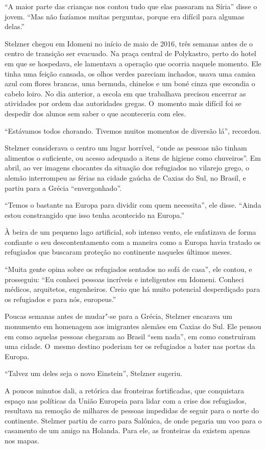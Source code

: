 ``A maior parte das crianças nos contou tudo que elas passaram na
Síria'' disse o jovem. ``Mas não fazíamos muitas perguntas, porque era
difícil para algumas delas.''

Stelzner chegou em Idomeni no início de maio de 2016, três semanas antes
de o centro de transição ser evacuado. Na praça central de Polykastro,
perto do hotel em que se hospedava, ele lamentava a operação que ocorria
naquele momento. Ele tinha uma feição cansada, os olhos verdes pareciam
inchados, usava uma camisa azul com flores brancas, uma bermuda, chinelos
e um boné cinza que escondia o cabelo loiro. No dia anterior, a escola em
que trabalhava precisou encerrar as atividades por ordem das autoridades
gregas. O~momento mais difícil foi se despedir dos alunos sem saber o
que aconteceria com eles.

``Estávamos todos chorando. Tivemos muitos momentos de
diversão lá'', recordou.

Stelzner considerava o centro um lugar horrível, ``onde as pessoas não
tinham alimentos o suficiente, ou acesso adequado a itens de higiene
como chuveiros''. Em abril, ao ver imagens chocantes da situação dos
refugiados no vilarejo grego, o alemão interrompeu as férias na cidade
gaúcha de Caxias do Sul, no Brasil, e partiu para a Grécia
``envergonhado''.

``Temos o bastante na Europa para dividir com quem necessita'', ele disse.
``Ainda estou constrangido que isso tenha acontecido na Europa.''

À beira de um pequeno lago artificial, sob intenso vento, ele enfatizava
de forma confiante o seu descontentamento com a maneira como a Europa
havia tratado os refugiados que buscaram proteção no continente naqueles
últimos meses.

``Muita gente opina sobre os refugiados sentados no sofá de casa'',
ele contou, e prosseguiu: ``Eu conheci pessoas incríveis e inteligentes em Idomeni.
Conheci médicos, arquitetos, engenheiros. Creio que há muito potencial
desperdiçado para os refugiados e para nós, europeus.''

Poucas semanas antes de mudar"-se para a Grécia, Stelzner encarava um
monumento em homenagem aos imigrantes alemães em Caxias do Sul. Ele
pensou em como aquelas pessoas chegaram ao Brasil ``sem nada'', em como
construíram uma cidade. O~mesmo destino poderiam ter os refugiados a
bater nas portas da Europa.

``Talvez um deles seja o novo Einstein'', Stelzner sugeriu.

A poucos minutos dali, a retórica das fronteiras fortificadas, que
conquistara espaço nas políticas da União Europeia para lidar com a
crise dos refugiados, resultava na remoção de milhares de pessoas
impedidas de seguir para o norte do continente. Stelzner partiu de
carro para Salônica, de onde pegaria um voo para o casamento de um amigo
na Holanda. Para ele, as fronteiras da  existem apenas nos mapas.

